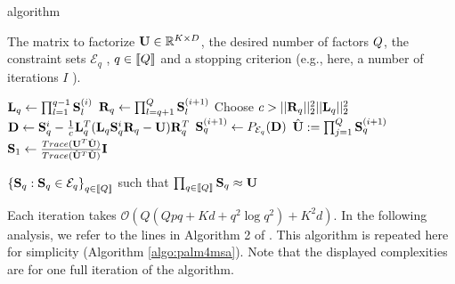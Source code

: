 \begin{algorithm}
	\caption{\palm algorithm}
	\label{algo:palm4msa}
	\begin{algorithmic}[1]
		
		\REQUIRE The matrix to factorize ${\mathbf{U}} \in \mathbb{R}^{K \times D}$, the desired number of factors $Q$, the constraint sets $\mathcal{E}_q$ , $q\in \left \llbracket Q\right \rrbracket$ and a stopping criterion (e.g., here, a number of iterations $I$ ).
		
		
		\STATE  ${\mathbf{L}}_q \leftarrow \prod_{l=1}^{q-1} {\mathbf{S}}_{l}^{(i)}$
		\STATE  ${\mathbf{R}}_q \leftarrow \prod_{l=q+1}^{Q} {\mathbf{S}}_{l}^{(i+1)}$
		\STATE Choose $c > ||{\mathbf{R}}_q||_2^2 ||{\mathbf{L}}_q||_2^2$
		\STATE ${\mathbf{D}} \leftarrow {\mathbf{S}}_q^i - \frac{1}{c} {\mathbf{L}}_q^T({\mathbf{L}}_q {\mathbf{S}}_q^i {\mathbf{R}}_q - {\mathbf{U}}){\mathbf{R}}_q^T$
		\STATE ${\mathbf{S}}^{(i+1)}_q \leftarrow P_{\mathcal{E}_q}({\mathbf{D}})$
		\ENDFOR
		\STATE $\hat {{\mathbf{U}}} := \prod_{j=1}^{Q} {\mathbf{S}}_q^{(i+1)}$
		\STATE ${\mathbf{S}}_1 \leftarrow \frac{Trace({\mathbf{U}}^T\hat{{\mathbf{U}}})}{Trace(\hat{{\mathbf{U}}}^T\hat{{\mathbf{U}}})} {\mathbf{I}}$
		\ENDFOR
		
		\ENSURE $\left \lbrace {\mathbf{S}}_q : {\mathbf{S}}_q \in \mathcal{E}_q\right \rbrace_{q\in\left \llbracket Q\right \rrbracket}$ such that $\prod_{q\in\left \llbracket Q\right \rrbracket}{\mathbf{S}}_q \approx {\mathbf{U}}$
		
	\end{algorithmic}
\end{algorithm}

Each iteration takes $\mathcal{O}(Q(Qpq + Kd + q^2\log q^2) + K^2d)$. In the following analysis, we refer to the lines in Algorithm 2 of \cite{magoarou2014learning}. This algorithm is repeated here for simplicity (Algorithm \ref{algo:palm4msa}). Note that the displayed complexities are for one full iteration of the algorithm.


